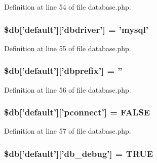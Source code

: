 Definition at line 54 of file database.\-php.

\hypertarget{development_2database_8php_a9f97429a3096d60fa26291b35f6cb7a9}{
\subsubsection[{\$db}]{\setlength{\rightskip}{0pt plus 5cm}\$db\mbox{[}'default'\mbox{]}\mbox{[}'dbdriver'\mbox{]} = 'mysql'}}\label{development_2database_8php_a9f97429a3096d60fa26291b35f6cb7a9}


Definition at line 55 of file database.\-php.

\hypertarget{development_2database_8php_ae0a3c1b4e2a1907dc70671ee97901456}{
\subsubsection[{\$db}]{\setlength{\rightskip}{0pt plus 5cm}\$db\mbox{[}'default'\mbox{]}\mbox{[}'dbprefix'\mbox{]} = ''}}\label{development_2database_8php_ae0a3c1b4e2a1907dc70671ee97901456}


Definition at line 56 of file database.\-php.

\hypertarget{development_2database_8php_a0bf35d484095b6728c2666580924569b}{
\subsubsection[{\$db}]{\setlength{\rightskip}{0pt plus 5cm}\$db\mbox{[}'default'\mbox{]}\mbox{[}'pconnect'\mbox{]} = F\-A\-L\-S\-E}}\label{development_2database_8php_a0bf35d484095b6728c2666580924569b}


Definition at line 57 of file database.\-php.

\hypertarget{development_2database_8php_aa79c6a73d78063a2b2ee6903a9851908}{
\subsubsection[{\$db}]{\setlength{\rightskip}{0pt plus 5cm}\$db\mbox{[}'default'\mbox{]}\mbox{[}'db\-\_\-debug'\mbox{]} = T\-R\-U\-E}}\label{development_2database_8php_aa79c6a73d78063a2b2ee6903a9851908}


